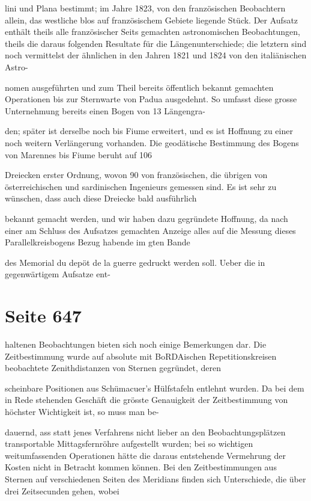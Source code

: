 \documentclass[10pt,a4paper]{article}
\begin{document}
lini und Plana bestimmt; im Jahre 1823, von den französischen Beobachtern allein, das westliche blos auf französischem Gebiete liegende Stück. Der Aufsatz enthält theils alle französischer Seits gemachten astronomischen Beobachtungen, theils die daraus folgenden Resultate für die Längenunterschiede; die letztern sind noch vermittelst der ähnlichen in den Jahren 1821 und 1824 von den italiänischen Astro-

nomen ausgeführten und zum Theil bereits öffentlich bekannt gemachten Operationen bis zur Sternwarte von Padua ausgedehnt. So umfasst diese grosse Unternehmung bereits einen Bogen von 13 Längengra-

den; später ist derselbe noch bis Fiume erweitert, und es ist Hoffnung zu einer noch weitern Verlängerung vorhanden. Die geodätische Bestimmung des Bogens von Marennes bis Fiume beruht auf 106

Dreiecken erster Ordnung, wovon 90 von französischen, die übrigen von österreichischen und sardinischen Ingenieurs gemessen sind. Es ist sehr zu wünschen, dass auch diese Dreiecke bald ausführlich

bekannt gemacht werden, und wir haben dazu gegründete Hoffnung, da nach einer am Schluss des Aufsatzes gemachten Anzeige alles auf die Messung dieses Parallelkreisbogens Bezug habende im gten Bande

des Memorial du depöt de la guerre gedruckt werden soll. Ueber die in gegenwärtigem Aufsatze ent-


\newpage
\section*{Seite 647}
haltenen Beobachtungen bieten sich noch einige Bemerkungen dar. Die Zeitbestimmung wurde auf absolute mit BoRDAischen Repetitionskreisen beobachtete Zenithdistanzen von Sternen gegründet, deren

scheinbare Positionen aus Schümacuer's Hülfstafeln entlehnt wurden. Da bei dem in Rede stehenden Geschäft die grösste Genauigkeit der Zeitbestimmung von höchster Wichtigkeit ist, so muss man be-

dauernd, ass statt jenes Verfahrens nicht lieber an den Beobachtungsplätzen transportable Mittagsfernröhre aufgestellt wurden; bei so wichtigen weitumfassenden Operationen hätte die daraus entstehende Vermehrung der Kosten nicht in Betracht kommen können. Bei den Zeitbestimmungen aus Sternen auf verschiedenen Seiten des Meridians finden sich Unterschiede, die über drei Zeitsecunden gehen, wobei
\end{document}
